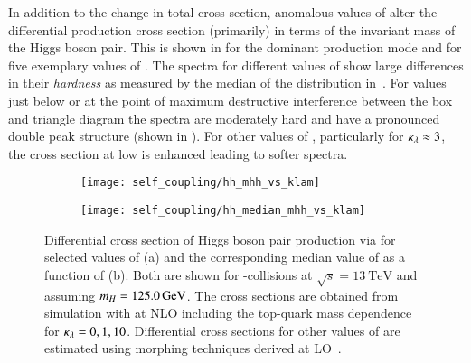 In addition to the change in total cross section, anomalous values of
\klambda alter the differential \HH production cross section
(primarily) in terms of the invariant mass of the Higgs boson
pair. This is shown in  for the dominant \ggF
production mode and for five exemplary values of \klambda. The \mHH
spectra for different values of \klambda show large differences in
their \emph{hardness} as measured by the median of the \mHH
distribution in~. For \klambda values just
below or at the point of maximum destructive interference between the
box and triangle diagram the \mHH spectra are moderately hard and have
a pronounced double peak structure (shown in
). For other values of \klambda, particularly
for $\kappa_{\lambda} \approx 3$, the cross section at low \mHH is enhanced
leading to softer \mHH spectra.

\begin{figure}[htbp]
  \begin{subfigure}[t]{0.485\textwidth}
    \texttt{[image: self\_coupling/hh\_mhh\_vs\_klam]}
    \label{fig:hh_xsec_mhh}
  \end{subfigure}\hfill%
  \begin{subfigure}[t]{0.485\textwidth}
    \texttt{[image: self\_coupling/hh\_median\_mhh\_vs\_klam]}
    \label{fig:hh_median_mhh}
  \end{subfigure}

  \caption{Differential cross section of Higgs boson pair production
    via \ggF for selected values of \klambda (a) and the corresponding
    median value of \mHH as a function of \klambda (b). Both are shown
    for \pp-collisions at $\sqrt{s} = \SI{13}{\TeV}$ and assuming
    $m_{H}= \SI{125.0}{\ensuremath{\text{GeV}}}$. The cross sections are obtained from
    simulation with \POWHEGBOX[v2] at NLO including the top-quark mass
    dependence~\cite{Heinrich:2019bkc,Heinrich:2020ckp} for
    $\kappa_{\lambda} = 0, 1, 10$. Differential cross sections for other
    values of \klambda are estimated using morphing techniques derived
    at LO~\cite{ATL-PHYS-PUB-2019-007}.}
\end{figure}

